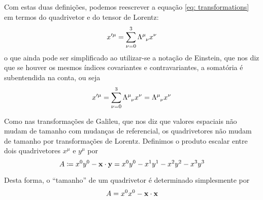 Com estas duas definições, podemos reescrever a equação \eqref{eq: transformations} em termos do quadrivetor e do tensor de Lorentz:
    \begin{equation*}
        x^{\prime \mu} = \sum_{\nu=0}^{3} \tensor{\Lambda}{^{\mu}_{\nu}}x^{\nu}
    \end{equation*}
o que ainda pode ser simplificado ao utilizar-se a notação de Einstein, que nos diz que se houver os mesmos índices covariantes e contravariantes, a somatória é subentendida na conta, ou seja
    \begin{equation*}
        x^{\prime \mu} = \sum_{\nu=0}^{3} \tensor{\Lambda}{^{\mu}_{\nu}}x^{\nu} = \tensor{\Lambda}{^{\mu}_{\nu}}x^{\nu}
    \end{equation*}

Como nas transformações de Galileu, que nos diz que valores espaciais não mudam de tamanho com mudanças de referencial, os quadrivetores não mudam de tamanho por transformações de Lorentz. Definimos o produto escalar entre dois quadrivetores $x^{\mu}$ e $y^{\mu}$ por 
    \begin{equation}\label{eq: produto escalar}
        A \coloneqq x^{0}y^{0} - \vb{x}\cdot\vb{y} = x^{0}y^{0} - x^{1}y^{1} - x^{2}y^{2} - x^{3}y^{3}
    \end{equation}

Desta forma, o ``tamanho'' de um quadrivetor é determinado simplesmente por
    \begin{equation*}
        A = x^{0}x^{0} - \vb{x}\cdot\vb{x}
    \end{equation*}


